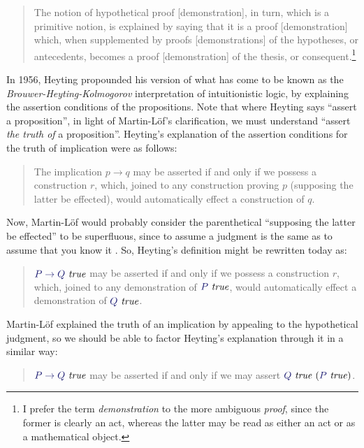 \documentclass[11pt]{amsart}
\theoremstyle{definition}
\theoremstyle{remark}
\numberwithin{equation}{section}
\def\InputModeColorName{MidnightBlue}
\newcommand\InputMode[1]{{\color{\InputModeColorName}{#1}}}
\newcommand\HypJ[2]{#1\ (#2)}
\newcommand\IsTrue[1]{\InputMode{#1}\ \mathit{true}}
\begin{document}
\begin{quote}
  The notion of hypothetical proof [demonstration], in turn, which is a
primitive notion, is explained by saying that it is a proof [demonstration]
which, when supplemented by proofs [demonstrations] of the hypotheses, or
antecedents, becomes a proof [demonstration] of the thesis, or
consequent.\footnote{
I prefer the term \emph{demonstration} to the more ambiguous \emph{proof}, since
the former is clearly an act, whereas the latter may be read as either an act or
as a mathematical object.
}
\cite{siena.lectures}
\end{quote}


In 1956, Heyting propounded his version of what has come to be known as the
\emph{Brouwer-Heyting-Kolmogorov} interpretation of intuitionistic logic, by
explaining the assertion conditions of the propositions. Note that where Heyting
says ``assert a proposition'', in light of Martin-L\"of's clarification, we must
understand ``assert \emph{the truth of} a proposition''. Heyting's explanation
of the assertion conditions for the truth of implication were as follows:
\begin{quote}
  The implication $p\to q$ may be asserted if and only if we possess a
  construction $r$, which, joined to any construction proving $p$ (supposing the
  latter be effected), would automatically effect a construction of $q$. \cite{HeytingA:int}
\end{quote}

Now, Martin-L\"of would probably consider the parenthetical ``supposing the
latter be effected'' to be superfluous, since to assume a judgment is the same
as to assume that you know it \cite{siena.lectures}.
So, Heyting's definition might be rewritten today as:

\begin{quote}
$\IsTrue{P\to Q}$ may be asserted if and only if we
possess a construction $r$, which, joined to any demonstration of $\IsTrue{P}$,
would automatically effect a demonstration of $\IsTrue{Q}$.
\end{quote}

Martin-L\"of explained the truth of an implication by appealing to the
hypothetical judgment, so we should be able to factor Heyting's explanation
through it in a similar way:

\begin{quote}
  $\IsTrue{P\to Q}$ may be asserted if and only if we may assert $\HypJ{\IsTrue{Q}}{\IsTrue{P}}$.
\end{quote}
\end{document}
